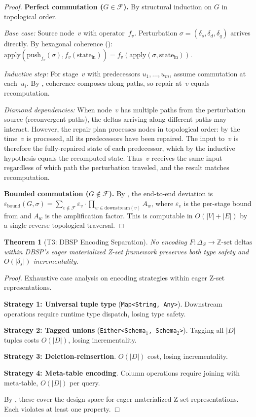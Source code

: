 \documentclass[11pt,a4paper]{article}
\newtheorem{theorem}{Theorem}[section]
\theoremstyle{definition}
\newcommand{\DeltaS}{\Delta_{\!S}}
\newcommand{\push}{\mathrm{push}}
\newcommand{\FragF}{\mathcal{F}}
\newcommand{\ebound}{\varepsilon_{\mathrm{bound}}}
\begin{document}
\begin{proof}
\textbf{Perfect commutation ($G \in \FragF$).}
By structural induction on $G$ in topological order.

\emph{Base case:} Source node~$v$ with operator~$f_v$.  Perturbation
$\sigma = (\delta_s, \delta_d, \delta_q)$ arrives directly.  By hexagonal
coherence ():
$\mathrm{apply}(\push_{f_v}(\sigma), f_v(\mathrm{state}_{\mathrm{in}}))
= f_v(\mathrm{apply}(\sigma, \mathrm{state}_{\mathrm{in}}))$.

\emph{Inductive step:} For stage~$v$ with predecessors $u_1, \ldots, u_m$,
assume commutation at each~$u_i$.  By , coherence
composes along paths, so repair at~$v$ equals recomputation.

\emph{Diamond dependencies:} When node~$v$ has multiple paths from the
perturbation source (reconvergent paths), the deltas arriving along different
paths may interact.  However, the repair plan processes nodes in topological
order: by the time~$v$ is processed, all its predecessors have been repaired.
The input to~$v$ is therefore the fully-repaired state of each predecessor,
which by the inductive hypothesis equals the recomputed state.  Thus~$v$
receives the same input regardless of which path the perturbation traveled,
and the result matches recomputation.

\textbf{Bounded commutation ($G \notin \FragF$).}
By , the end-to-end deviation is
$\ebound(G, \sigma) = \sum_{v \notin \FragF} \varepsilon_v \cdot
\prod_{w \in \mathrm{downstream}(v)} A_w$,
where $\varepsilon_v$ is the per-stage bound from 
and $A_w$ is the amplification factor.  This is computable in $O(|V| + |E|)$
by a single reverse-topological traversal.
\end{proof}

\begin{theorem}[T3: DBSP Encoding Separation]\label{thm:dbsp}
No encoding $F\colon \DeltaS \to \mathbb{Z}\text{-set deltas}$ within DBSP's
eager materialized Z-set framework preserves both type safety and
$O(|\delta_s|)$ incrementality.
\end{theorem}

\begin{proof}
Exhaustive case analysis on encoding strategies within eager Z-set
representations.

\textbf{Strategy 1: Universal tuple type} (\texttt{Map<String, Any>}).
Downstream operations require runtime type dispatch, losing type safety.

\textbf{Strategy 2: Tagged unions} (\texttt{Either<Schema$_1$, Schema$_2$>}).
Tagging all $|D|$ tuples costs $O(|D|)$, losing incrementality.

\textbf{Strategy 3: Deletion-reinsertion}.
$O(|D|)$ cost, losing incrementality.

\textbf{Strategy 4: Meta-table encoding}.
Column operations require joining with meta-table, $O(|D|)$ per query.

By , these cover the design space for eager materialized
Z-set representations.  Each violates at least one property.
\end{proof}
\end{document}
